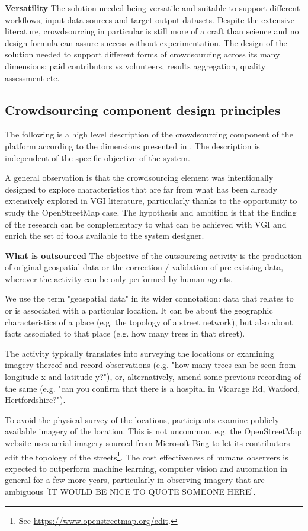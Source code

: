 \textbf{Versatility} The solution needed being versatile and suitable to support different workflows, input data sources and target output datasets. Despite the extensive literature, crowdsourcing in particular is still more of a craft than science and no design formula can assure success without experimentation. The design of the solution needed to support different forms of crowdsourcing across its many dimensions: paid contributors vs volunteers, results aggregation, quality assessment etc.

\subsection{Crowdsourcing component design principles}

The following is a high level description of the crowdsourcing component of the platform according to the dimensions presented in \cite{Wearethedata:2015uo}. The description is independent of the specific objective of the system. 

A general observation is that the crowdsourcing element was intentionally designed to explore characteristics that are far from what has been already extensively explored in VGI literature, particularly thanks to the opportunity to study the OpenStreetMap case. The hypothesis and ambition is that the finding of the research can be complementary to what can be achieved with VGI and enrich the set of tools available to the system designer.

\textbf{What is outsourced} The objective of the outsourcing activity is the production of original geospatial data or the correction / validation of pre-existing data, wherever the activity can be only performed by human agents. 

We use the term "geospatial data" in its wider connotation: data that relates to or is associated with a particular location. It can be about the geographic characteristics of a place (e.g. the topology of a street network), but also about facts associated to that place (e.g. how many trees in that street).

The activity typically translates into surveying the locations or examining imagery thereof and record observations (e.g. "how many trees can be seen from longitude x and latitude y?"), or, alternatively, amend some previous recording of the same (e.g. "can you confirm that there is a hospital in Vicarage Rd, Watford, Hertfordshire?"). 

To avoid the physical survey of the locations, participants examine publicly available imagery of the location. This is not uncommon, e.g. the OpenStreetMap website uses aerial imagery sourced from Microsoft Bing to let its contributors edit the topology of the streets\footnote{See \url{https://www.openstreetmap.org/edit}.}. The cost effectiveness of humans observers is expected to outperform machine learning, computer vision and automation in general for a few more years, particularly in observing imagery that are ambiguous [IT WOULD BE NICE TO QUOTE SOMEONE HERE].

